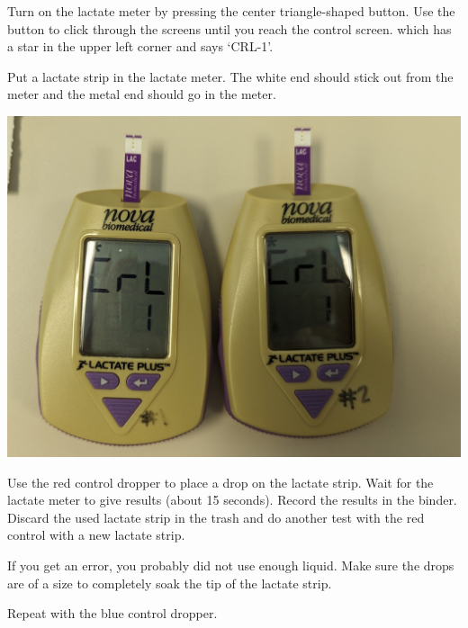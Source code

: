 \documentclass[
]{book}
\begin{document}
Turn on the lactate meter by pressing the center triangle-shaped button. Use the button to click through the screens until you reach the control screen. which has a star in the upper left corner and says `CRL-1'.

Put a lactate strip in the lactate meter. The white end should stick out from the meter and the metal end should go in the meter.

\includegraphics[width=1\linewidth]{images/lactatequalitycontrol/lactate_meters_ready}

Use the red control dropper to place a drop on the lactate strip. Wait for the lactate meter to give results (about 15 seconds). Record the results in the binder. Discard the used lactate strip in the trash and do another test with the red control with a new lactate strip.

If you get an error, you probably did not use enough liquid. Make sure the drops are of a size to completely soak the tip of the lactate strip.

Repeat with the blue control dropper.
\end{document}
